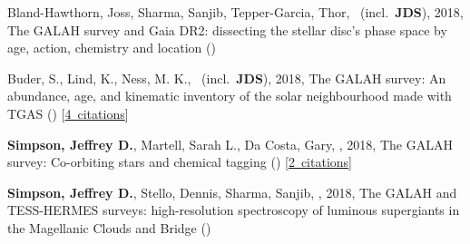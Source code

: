 \item[{\color{numcolor}\scriptsize4}] Bland-Hawthorn, Joss, Sharma, Sanjib, Tepper-Garcia, Thor, \etal\ (incl.\ \textbf{JDS}), 2018, The GALAH survey and Gaia DR2: dissecting the stellar disc's phase space by age, action, chemistry and location ()

\item[{\color{numcolor}\scriptsize3}] Buder, S., Lind, K., Ness, M. K., \etal\ (incl.\ \textbf{JDS}), 2018, The GALAH survey: An abundance, age, and kinematic inventory of the solar neighbourhood made with TGAS () [\href{https://ui.adsabs.harvard.edu/#abs/2018arXiv180405869B}{4~citations}]

\item[{\color{numcolor}\scriptsize2}] \textbf{Simpson, Jeffrey D.}, Martell, Sarah L., Da Costa, Gary, \etal, 2018, The GALAH survey: Co-orbiting stars and chemical tagging () [\href{https://ui.adsabs.harvard.edu/#abs/2018arXiv180405894S}{2~citations}]

\item[{\color{numcolor}\scriptsize1}] \textbf{Simpson, Jeffrey D.}, Stello, Dennis, Sharma, Sanjib, \etal, 2018, The GALAH and TESS-HERMES surveys: high-resolution spectroscopy of luminous supergiants in the Magellanic Clouds and Bridge ()
